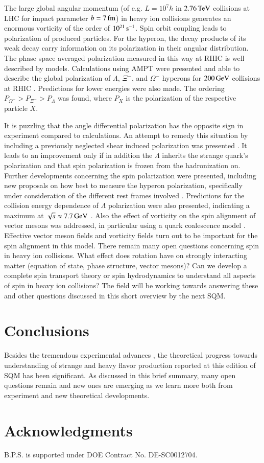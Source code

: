 \documentclass{webofc}
\begin{document}
The large global angular momentum (of e.g. $L=10^7 \hbar$ in $2.76\,{\rm TeV}$ collisions at LHC for impact parameter $b=7\,{\rm fm}$) in heavy ion collisions generates an enormous vorticity of the order of $10^{21}\,{\rm s}^{-1}$. Spin orbit coupling leads to polarization of produced particles. For the hyperon, the decay products of its weak decay carry information on its polarization in their angular distribution. The phase space averaged polarization measured in this way at RHIC is well described by models. Calculations using AMPT were presented and able to describe the global polarization of $\Lambda$, $\Xi^-$, and $\Omega^-$ hyperons for $200\,{\rm GeV}$ collisions at RHIC \cite{Li:2021zwq}. Predictions for lower energies were also made. The ordering $P_{\Omega^-}>P_{\Xi^-}>P_{\Lambda}$ was found, where $P_X$ is the polarization of the respective particle $X$.

It is puzzling that the angle differential polarization has the opposite sign in experiment compared to calculations. An attempt to remedy this situation by including a previously neglected shear induced polarization was presented \cite{Fu:2021pok,Liu:2021uhn}. It leads to an improvement only if in addition the $\Lambda$ inherits the strange quark's polarization and that spin polarization is frozen from the hadronization on. Further developments concerning the spin polarization were presented, including new proposals on how best to measure the hyperon polarization, specifically under consideration of the different rest frames involved \cite{Florkowski:2021pkp}. Predictions for the collision energy dependence of $\Lambda$ polarization were also presented, indicating a maximum at $\sqrt{s}\approx 7.7\,{\rm GeV}$ \cite{Guo:2021uqc}. Also the effect of vorticity on the spin alignment of vector mesons was addressed, in particular using a quark coalescence model \cite{Sheng:2020ghv,Sheng:2019kmk}. Effective vector meson fields and vorticity fields turn out to be important for the spin alignment in this model. There remain many open questions concerning spin in heavy ion collisions. What effect does rotation have on strongly interacting matter (equation of state, phase structure, vector mesons)? Can we develop a complete spin transport theory or spin hydrodynamics to understand all aspects of spin in heavy ion collisions? The field will be working towards answering these and other questions discussed in this short overview by the next SQM. 

\section{Conclusions}
Besides the tremendous experimental advances \cite{bellini}, the theoretical progress towards understanding of strange and heavy flavor production reported at this edition of SQM has been significant. As discussed in this brief summary, many open questions remain and new ones are emerging as we learn more both from experiment and new theoretical developments.

\section*{Acknowledgments}
B.P.S. is supported under DOE Contract No. DE-SC0012704. 

\vspace{-0.2cm}

\end{document}
